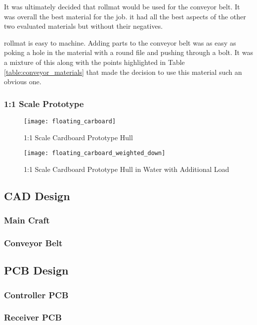 \documentclass [11pt]{article}
\begin{document}
It was ultimately decided that \gls{rollmat} would be used for the conveyor belt. It was overall the best material for the job. it had all the best aspects of the other two evaluated materials but without their negatives. 

\Gls{rollmat} is easy to machine. Adding parts to the conveyor belt was as easy as poking a hole in the material with a round file and pushing through a bolt. It was a mixture of this along with the points highlighted in Table \ref{table:conveyor_materials} that made the decision to use this material such an obvious one.  

\subsubsection{1:1 Scale Prototype}

\begin{figure}[H]
\centerline{\texttt{[image: floating\_carboard]}}
\caption{1:1 Scale Cardboard Prototype Hull}
\label{fig:floating_carboard}
\end{figure}

\begin{figure}[H]
\centerline{\texttt{[image: floating\_carboard\_weighted\_down]}}
\caption{1:1 Scale Cardboard Prototype Hull in Water with Additional Load}
\label{fig:floating_carboard_weighted_down}
\end{figure}


\subsection{CAD Design}
\subsubsection{Main Craft}
\subsubsection{Conveyor Belt}
\subsection{PCB Design}
\subsubsection{Controller PCB}
\subsubsection{Receiver PCB}
\end{document}
